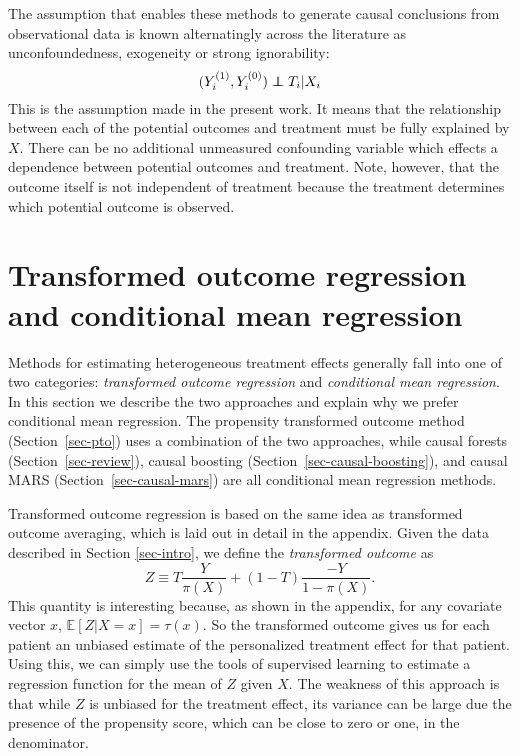 \documentclass{article}
\def\mE{\mathbb{E}}\def\mI{\mathbb{I}}\def\mP{\mathbb{P}}\def\mR{\mathbb{R}}
\newcommand\independent{\protect\mathpalette{\protect\independenT}{\perp}}
\def\independenT#1#2{\mathrel{\rlap{$#1#2$}\mkern2mu{#1#2}}}
\begin{document}
The assumption that enables these methods to generate causal conclusions from
observational data is known alternatingly across the literature as
unconfoundedness, exogeneity or strong ignorability:
$$(Y_i^{(1)}, Y_i^{(0)}) \independent T_i | X_i$$
This is the assumption made in the present work. It means that the relationship
between each of the potential outcomes and treatment must be fully explained by
$X$.
There can be no additional unmeasured confounding variable which effects a
dependence between potential outcomes and treatment. Note, however, that the
outcome itself is not independent of treatment because the treatment determines
which potential outcome is observed.




\section{Transformed outcome regression and conditional mean regression}
\label{sec-bigpic}

Methods for estimating heterogeneous treatment effects generally fall into one
of two categories: {\it transformed outcome regression} and  {\it conditional
mean regression}. In this section we describe the two approaches and explain
why we prefer conditional mean regression. The propensity
transformed outcome method (Section~\ref{sec-pto}) uses a combination of
the two approaches, while causal forests (Section~\ref{sec-review}),  
causal boosting (Section~\ref{sec-causal-boosting}), and causal MARS
(Section~\ref{sec-causal-mars}) are all conditional mean regression methods.

Transformed outcome regression is based on the same idea as transformed outcome
averaging, which is laid out in detail in the appendix. Given the data
described in Section \ref{sec-intro}, we define the {\it transformed outcome}
as
$$Z \equiv T\frac{Y}{\pi(X)} + (1 - T)\frac{-Y}{1 - \pi(X)}.$$
This quantity is interesting because, as shown in the appendix, for any
covariate vector $x$, $\mE[Z | X = x] = \tau(x)$. So the transformed outcome
gives us for each patient an unbiased estimate of the personalized treatment
effect for that patient. Using this, we can simply use the tools of supervised
learning to estimate a regression function for the mean of $Z$ given $X$. The
weakness of this approach is that while $Z$ is unbiased for the treatment
effect, its variance can be large due the presence of the propensity score,
which can be close to zero or one, in the denominator.
\end{document}
